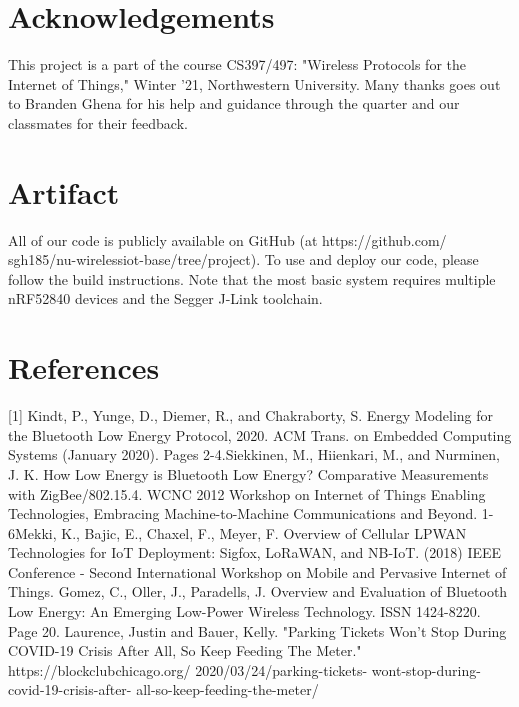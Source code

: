 \documentclass[sigconf]{acmart}
\begin{document}
\section{Acknowledgements}
This project is a part of the course CS397/497: "Wireless Protocols
for the Internet of Things," Winter '21, Northwestern University.
Many thanks goes out to Branden Ghena for his help and guidance
through the quarter and our classmates for their feedback.

\section{Artifact}
All of our code is publicly available on GitHub (at https://github.com/
sgh185/nu-wirelessiot-base/tree/project).
To use and deploy our code, please follow the build instructions.
Note that the most basic system requires multiple nRF52840 devices and
the Segger J-Link toolchain.

\section{References}
[1] Kindt, P., Yunge, D., Diemer, R., and Chakraborty, S. Energy Modeling for the Bluetooth Low Energy Protocol, 2020. ACM Trans. on Embedded Computing Systems (January 2020). Pages 2-4.\newline\newline
[2] Siekkinen, M., Hiienkari, M., and Nurminen, J. K. How Low Energy is Bluetooth Low Energy?
Comparative Measurements with ZigBee/802.15.4. WCNC 2012 Workshop on Internet of Things Enabling Technologies, Embracing Machine-to-Machine Communications and
Beyond. 1-6\newline\newline
[3] Mekki, K., Bajic, E., Chaxel, F., Meyer, F. Overview of Cellular LPWAN Technologies for IoT Deployment: Sigfox, LoRaWAN, and NB-IoT. (2018) IEEE Conference - Second International Workshop on Mobile and Pervasive Internet of Things. \newline \newline
[4] Gomez, C., Oller, J., Paradells, J. Overview and Evaluation of Bluetooth Low Energy:
An Emerging Low-Power Wireless Technology. ISSN 1424-8220. Page 20. \newline\newline
[5] Laurence, Justin and Bauer, Kelly. "Parking Tickets Won’t Stop During COVID-19 Crisis After All, So Keep Feeding The Meter." https://blockclubchicago.org/
2020/03/24/parking-tickets-
wont-stop-during-covid-19-crisis-after-
all-so-keep-feeding-the-meter/
\end{document}
